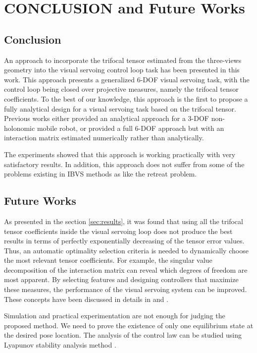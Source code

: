\section{CONCLUSION and Future Works}
\subsection{Conclusion}

An approach to incorporate the trifocal tensor estimated from the three-views geometry into the visual servoing control loop task has been presented in this work. This approach presents a generalized 6-DOF visual servoing task, with the control loop being closed over projective measures, namely the trifocal tensor coefficients. To the best of our knowledge, this approach is the first to propose a fully analytical design for a visual servoing task based on the trifocal tensor. Previous works either provided an analytical approach for a 3-DOF non-holonomic mobile robot, or provided a full 6-DOF approach but with an interaction matrix estimated numerically rather than analytically.

The experiments showed that this approach is working practically with very satisfactory results. In addition, this approach does not suffer from some of the problems existing in IBVS methods as like the retreat problem.

\subsection{Future Works}
As presented in the section \ref{sec:results}, it was found that using all the trifocal tensor coefficients inside the visual servoing loop does not produce the best results in terms of perfectly exponentially decreasing of the tensor error values. Thus, an automatic optimality selection criteria is needed to dynamically choose the most relevant tensor coefficients. For example, the singular value decomposition of the interaction matrix can reveal which degrees of freedom are most apparent. By selecting features and designing controllers that maximize these measures, the performance of the visual servoing system can be improved. These concepts have been discussed in details in \cite{538976} and \cite{611333}.

Simulation and practical experimentation are not enough for judging the proposed method. We need to prove the existence of only one equilibrium state at the desired pose location. The analysis of the control law can be studied using Lyapunov stability analysis method \cite{spong2006robot}.

